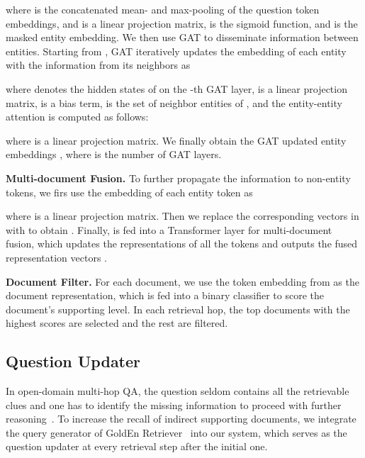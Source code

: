 \documentclass[sigconf]{acmart}
\begin{document}
where  is the concatenated mean- and max-pooling of the question token embeddings, and  is a linear projection matrix,  is the sigmoid function, and  is the masked entity embedding.
We then use GAT to disseminate information between entities. Starting from , GAT iteratively updates the embedding of each entity with the information from its neighbors as

where  denotes the hidden states of  on the -th GAT layer,  is a linear projection matrix,  is a bias term,  is the set of neighbor entities of , and the entity-entity attention  is computed as follows:

where  is a linear projection matrix. 
We finally obtain the GAT updated entity embeddings , where  is the number of GAT layers.


\BlankLine
\noindent \textbf{Multi-document Fusion.}
To further propagate the information to non-entity tokens, we firs use the embedding of each entity token as

where  is a linear projection matrix. Then we replace the corresponding vectors in  with  to obtain . Finally,  is fed into a Transformer \citep{vaswani2017attention} layer for multi-document fusion, which updates the representations of all the tokens and outputs the fused representation vectors .









\BlankLine
\noindent \textbf{Document Filter.}
For each document, we use the  token embedding from  as the document representation, which is fed into a binary classifier to score the document's supporting level. In each retrieval hop, the top  documents with the highest scores are selected and the rest are filtered.





\subsection{Question Updater}


In open-domain multi-hop QA, the question seldom contains all the retrievable clues and one has to identify the missing information to proceed with further reasoning~\cite{yang-etal-2018-hotpotqa}. To increase the recall of indirect supporting documents, we integrate the query generator of GoldEn Retriever~\citep{qi-etal-2019-answering} into our system, which serves as the question updater at every retrieval step after the initial one.
\end{document}
